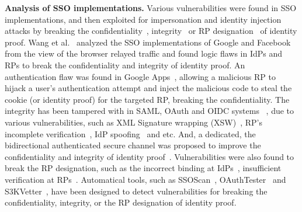 \noindent\textbf{Analysis of SSO implementations.}
Various vulnerabilities were found in SSO implementations, and then exploited for impersonation and identity injection attacks by breaking the confidentiality~\cite{WangCW12,ccsSunB12,ArmandoCCCPS13,DiscoveringJCS,dimvaLiM16}, integrity~\cite{WangCW12,SomorovskyMSKJ12,WangZLG16,MainkaMS16, MainkaMSW17,dimvaLiM16} or RP designation~\cite{WangZLG16,MainkaMS16,MainkaMSW17,YangLCZ18,dimvaLiM16} of identity proof. Wang et al.~\cite{WangCW12} analyzed the SSO implementations of Google and Facebook from the view of the browser relayed traffic and found logic flaws in IdPs and RPs to break the confidentiality and integrity of identity proof.
An authentication flaw was found in Google Apps~\cite{ArmandoCCCPS13}, allowing a malicious RP to hijack a user's authentication attempt and inject the malicious code to steal the cookie (or identity proof) for the targeted RP, breaking the confidentiality.
The integrity has been tampered with in SAML, OAuth and OIDC systems ~\cite{SomorovskyMSKJ12,WangCW12,WangZLG16,MainkaMS16, MainkaMSW17},
due to various vulnerabilities, such as  XML Signature wrapping (XSW)~\cite{SomorovskyMSKJ12}, RP's incomplete verification~\cite{WangCW12,WangZLG16,MainkaMSW17}, IdP spoofing~\cite{MainkaMS16,MainkaMSW17} and etc.
And, a dedicated, the bidirectional authenticated secure channel was proposed to improve the confidentiality and integrity of identity proof~\cite{CaoSBKVC14}.
Vulnerabilities were also found to break the RP designation, such as the incorrect binding  at IdPs~\cite{YangLCZ18,WangZLG16}, insufficient verification at RPs~\cite{MainkaMS16,MainkaMSW17,YangLCZ18}.
Automatical tools, such as SSOScan~\cite{ZhouE14}, OAuthTester~\cite{YangLLZH16} and S3KVetter~\cite{YangLCZ18}, have been designed to detect vulnerabilities for breaking the confidentiality, integrity, or the RP designation of identity proof.


